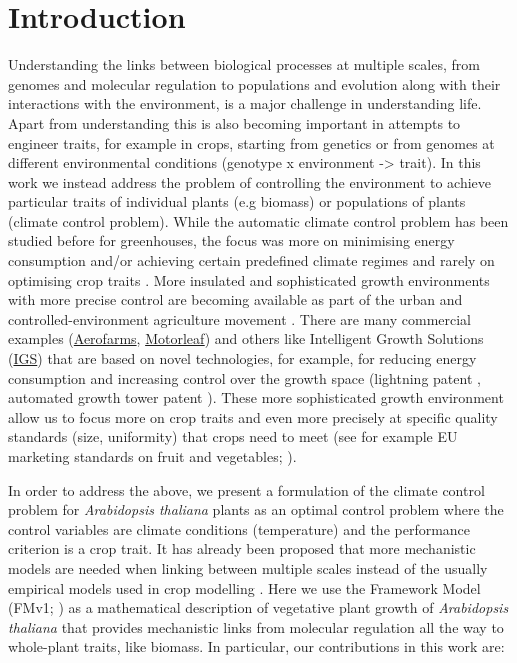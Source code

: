 \section{Introduction}
Understanding the links between biological processes at multiple scales, from
genomes and molecular regulation to populations and evolution along with their
interactions with the environment, is a major challenge in understanding
life. Apart from understanding this is also becoming important in attempts to
engineer traits, for example in crops, starting from genetics or from genomes at
different environmental conditions (genotype x environment ->
trait). In this work we instead address the problem of controlling the
environment to achieve particular traits of individual plants (e.g biomass) or
populations of plants (climate control problem). While the automatic climate
control problem has been studied before for greenhouses, the focus was more on
minimising energy consumption and/or achieving certain predefined climate
regimes and rarely on optimising crop traits \cite{Chalabi1996,
udinktenCate1983, Challa_1990, Aaslyng2003}. More insulated and sophisticated
growth environments with more precise control are becoming available as part of
the urban and controlled-environment agriculture movement \cite{mok_strawberry_2014, despommier_farming_2013}. There are many
commercial examples (\href{https://aerofarms.com/}{Aerofarms},
\href{https://motorleaf.com/}{Motorleaf}) and others like Intelligent Growth
Solutions (\href{https://www.intelligentgrowthsolutions.com/}{IGS}) that are based on
novel technologies, for example, for reducing energy consumption and increasing
control over the growth space (lightning patent \cite{aykroyd_novel_2016},
automated growth tower patent \cite{aykroyd_automated_2018}). These more
sophisticated growth environment allow us to focus more on crop traits and even
more precisely at specific quality standards (size, uniformity) that crops need
to meet (see for example EU marketing standards on fruit and vegetables;
\cite{eu-543-2011}).

In order to address the above, we present a formulation of the climate control
problem for \textit{Arabidopsis thaliana} plants as an optimal control problem
\cite{kirk_optimal_2012} where the control variables are climate conditions
(temperature) and the performance criterion is a crop trait. It has already been
proposed that more mechanistic models are needed when linking between multiple
scales instead of the usually empirical models used in crop modelling
\cite{yin_role_2004, yin_modelling_2010}. Here we use the Framework Model (FMv1;
\cite{chew2014multiscale}) as a mathematical description of vegetative plant
growth of \textit{Arabidopsis thaliana} that provides mechanistic links from
molecular regulation all the way to whole-plant traits, like biomass. In
particular, our contributions in this work are:

